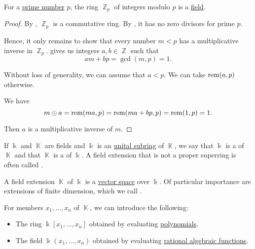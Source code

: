 \begin{proposition}\label{thm:ring_of_integers_modulo_prime_is_field}
  For a \hyperref[def:prime_number]{prime number} \( p \), the ring \hyperref[thm:ring_of_integers_modulo]{\( \BbbZ_p \)} of integers modulo \( p \) is a \hyperref[def:field]{field}.
\end{proposition}
\begin{proof}
  By , \( \BbbZ_p \) is a commutative ring. By , it has no zero divisors for prime \( p \).

  Hence, it only remains to show that every number \( m < p \) has a multiplicative inverse in \( \BbbZ_p \).  gives us integers \( a, b \in \BbbZ \) such that
  \begin{equation*}
    am + bp = \gcd(m, p) = 1.
  \end{equation*}

  Without loss of generality, we can assume that \( a < p \). We can take \( \operatorname{rem}(a, p) \) otherwise.

  We have
  \begin{equation*}
    m \odot a = \operatorname{rem}(ma, p) = \operatorname{rem}(ma + bp, p) = \operatorname{rem}(1, p) = 1.
  \end{equation*}

  Then \( a \) is a multiplicative inverse of \( m \).
\end{proof}

\begin{definition}\label{def:field_extension}
  If \( \Bbbk \) and \( \BbbK \) are fields and \( \Bbbk \) is an \hyperref[def:ring/submodel]{unital subring} of \( \BbbK \), we say that \( \Bbbk \) is a  of \( \BbbK \) and that \( \BbbK \) is a  of \( \Bbbk \). A field extension that is not a proper superring is often called .

  \begin{thmenum}
     A field extension \( \BbbK \) of \( \Bbbk \) is a \hyperref[def:vector_space]{vector space} over \( \Bbbk \). Of particular importance are extensions of finite dimension, which we call .

     For members \( x_1, \ldots, x_n \) of \( \BbbK \), we can introduce the following:
    \begin{itemize}
      \item The ring \( \Bbbk[x_1, \ldots, x_n] \) obtained by evaluating \hyperref[thm:polynomial_ring_universal_property]{polynomials}.
      \item The field \( \Bbbk(x_1, \ldots, x_n) \) obtained by evaluating \hyperref[def:rational_algebraic_function]{rational algebraic functions}.
    \end{itemize}
  \end{thmenum}
\end{definition}

